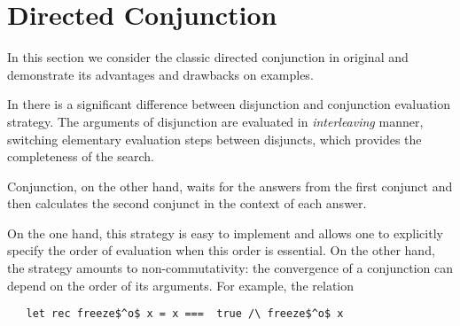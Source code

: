 \section{Directed Conjunction}
\label{sec:directed}

In this section we consider the classic directed conjunction in original \mk and demonstrate its advantages and drawbacks on examples. 


In \mk there is a significant difference between disjunction and conjunction evaluation strategy. The arguments of disjunction are evaluated
in \emph{interleaving} manner, switching elementary evaluation steps between disjuncts, which provides the completeness of the search.

Conjunction, on the other hand, waits for the answers from the first conjunct and then calculates the second conjunct in the context of each answer.

On the one hand, this strategy is easy to implement and allows one to explicitly specify the order of evaluation when this order is essential.
On the other hand, the strategy amounts to non-commutativity: the convergence of a conjunction can depend on the order of its arguments.
For example, the relation

\begin{lstlisting}
   let rec freeze$^o$ x = x ===  true /\ freeze$^o$ x
\end{lstlisting}

